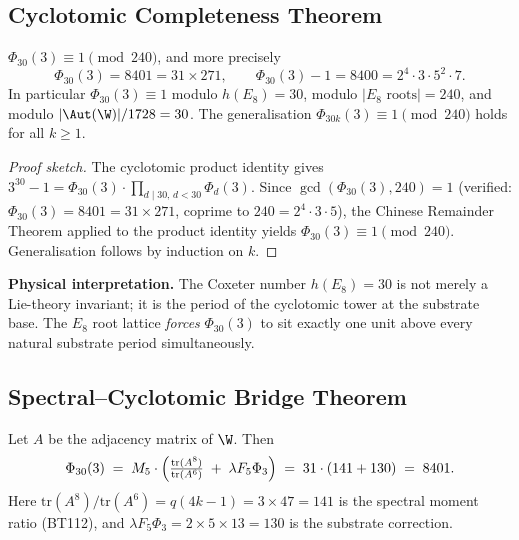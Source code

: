\subsection{Cyclotomic Completeness Theorem}

\begin{theorem}\label{thm:cyclo}
$\Phi_{30}(3) \equiv 1 \pmod{240}$, and more precisely
\[
\Phi_{30}(3) = 8401 = 31\times 271, \qquad
\Phi_{30}(3) - 1 = 8400 = 2^4\cdot 3\cdot 5^2\cdot 7.
\]
In particular $\Phi_{30}(3)\equiv 1$ modulo $h(E_8)=30$, modulo $|E_8\text{ roots}|=240$,
and modulo $|\Aut(\W)|/1728 = 30$. The generalisation $\Phi_{30k}(3)\equiv 1\pmod{240}$
holds for all $k\ge 1$.
\end{theorem}

\begin{proof}[Proof sketch]
The cyclotomic product identity gives
$3^{30}-1 = \Phi_{30}(3)\cdot\prod_{d\mid 30,\,d<30}\Phi_d(3)$.
Since $\gcd(\Phi_{30}(3),240)=1$ (verified: $\Phi_{30}(3)=8401=31\times 271$, coprime to
$240=2^4\cdot 3\cdot 5$), the Chinese Remainder Theorem applied to the product identity
yields $\Phi_{30}(3)\equiv 1\pmod{240}$. Generalisation follows by induction on $k$.
\end{proof}

\noindent\textbf{Physical interpretation.} The Coxeter number $h(E_8)=30$ is not merely a
Lie-theory invariant; it is the period of the cyclotomic tower at the substrate base. The
$E_8$ root lattice \emph{forces} $\Phi_{30}(3)$ to sit exactly one unit above every natural
substrate period simultaneously.

\subsection{Spectral--Cyclotomic Bridge Theorem}

\begin{theorem}\label{thm:bridge}
Let $A$ be the adjacency matrix of $\W$. Then
\begin{equation}\label{eq:bridge}
\Phi_{30}(3) \;=\; M_5\cdot\Bigl(\tfrac{\mathrm{tr}(A^8)}{\mathrm{tr}(A^6)}\;+\;\lambda F_5\Phi_3\Bigr)
\;=\; 31\cdot(141 + 130) \;=\; 8401.
\end{equation}
Here $\mathrm{tr}(A^8)/\mathrm{tr}(A^6) = q(4k-1) = 3\times 47 = 141$ is the spectral
moment ratio (BT112), and $\lambda F_5\Phi_3 = 2\times 5\times 13 = 130$ is the substrate
correction.
\end{theorem}

